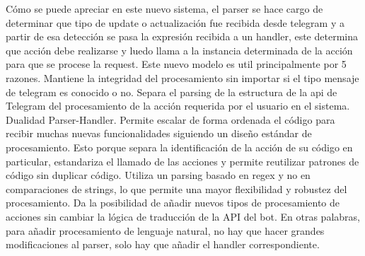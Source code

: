     Cómo se puede apreciar en este nuevo sistema, el parser se hace cargo de determinar que tipo de update o actualización fue recibida desde telegram y a partir de esa detección se pasa la expresión recibida a un handler, este determina que acción debe realizarse y luedo llama a la instancia determinada de la acción para que se procese la request. Este nuevo modelo es util principalmente por 5 razones.
    Mantiene la integridad del procesamiento sin importar si el tipo mensaje de telegram es conocido o no.
    Separa el parsing de la estructura de la api de Telegram del procesamiento de la acción requerida por el usuario en el sistema. Dualidad Parser-Handler.
    Permite escalar de forma ordenada el código para recibir muchas nuevas funcionalidades siguiendo un diseño estándar de procesamiento. Esto porque separa la identificación de la acción de su código en particular, estandariza el llamado de las acciones y permite reutilizar patrones de código sin duplicar código. 
    Utiliza un parsing basado en regex y no en comparaciones de strings, lo que permite una mayor flexibilidad y robustez del procesamiento.
    Da la posibilidad de añadir nuevos tipos de procesamiento de acciones sin cambiar la lógica  de traducción de la API del bot. En otras palabras, para añadir procesamiento de lenguaje natural, no hay que hacer grandes modificaciones al parser, solo hay que añadir el handler correspondiente.
